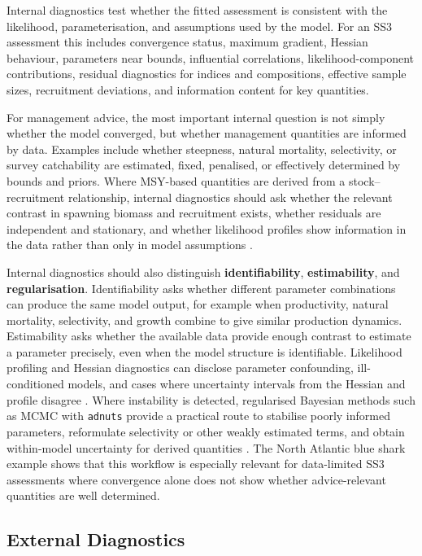 \documentclass[11pt,a4paper]{article}
\begin{document}
Internal diagnostics test whether the fitted assessment is consistent with the likelihood, parameterisation, and assumptions used by the model. For an SS3 assessment this includes convergence status, maximum gradient, Hessian behaviour, parameters near bounds, influential correlations, likelihood-component contributions, residual diagnostics for indices and compositions, effective sample sizes, recruitment deviations, and information content for key quantities.

For management advice, the most important internal question is not simply whether the model converged, but whether management quantities are informed by data. Examples include whether steepness, natural mortality, selectivity, or survey catchability are estimated, fixed, penalised, or effectively determined by bounds and priors. Where MSY-based quantities are derived from a stock--recruitment relationship, internal diagnostics should ask whether the relevant contrast in spawning biomass and recruitment exists, whether residuals are independent and stationary, and whether likelihood profiles show information in the data rather than only in model assumptions \citep{kell2025profile}.

Internal diagnostics should also distinguish \textbf{identifiability}, \textbf{estimability}, and \textbf{regularisation}. Identifiability asks whether different parameter combinations can produce the same model output, for example when productivity, natural mortality, selectivity, and growth combine to give similar production dynamics. Estimability asks whether the available data provide enough contrast to estimate a parameter precisely, even when the model structure is identifiable. Likelihood profiling and Hessian diagnostics can disclose parameter confounding, ill-conditioned models, and cases where uncertainty intervals from the Hessian and profile disagree \citep{kell2025profile}. Where instability is detected, regularised Bayesian methods such as MCMC with \texttt{adnuts} provide a practical route to stabilise poorly informed parameters, reformulate selectivity or other weakly estimated terms, and obtain within-model uncertainty for derived quantities \citep{courtney2024adnuts}. The North Atlantic blue shark example shows that this workflow is especially relevant for data-limited SS3 assessments where convergence alone does not show whether advice-relevant quantities are well determined.

\subsection{External Diagnostics}
\end{document}
